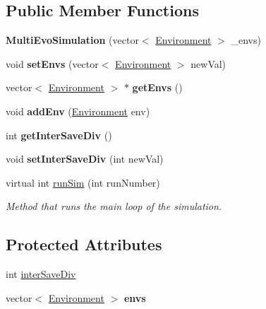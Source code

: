 \subsection*{Public Member Functions}
\begin{DoxyCompactItemize}
\item 
\mbox{\label{classMultiEvoSimulation_a39ba876ac0a8771dca1773b37de567dd}} 
{\bfseries Multi\+Evo\+Simulation} (vector$<$ \hyperlink{classEnvironment}{Environment} $>$ \+\_\+envs)
\item 
\mbox{\label{classMultiEvoSimulation_a965cbb6a21b59b1dcb69a8f7a5cdc63f}} 
void {\bfseries set\+Envs} (vector$<$ \hyperlink{classEnvironment}{Environment} $>$ new\+Val)
\item 
\mbox{\label{classMultiEvoSimulation_ad15f986cabbba30190e44c503bb02dbd}} 
vector$<$ \hyperlink{classEnvironment}{Environment} $>$ $\ast$ {\bfseries get\+Envs} ()
\item 
\mbox{\label{classMultiEvoSimulation_af1ed90eb8f214164e5944fa599bebc0f}} 
void {\bfseries add\+Env} (\hyperlink{classEnvironment}{Environment} env)
\item 
\mbox{\label{classMultiEvoSimulation_a38cb7774707b70d9d2b08f25132a2ca2}} 
int {\bfseries get\+Inter\+Save\+Div} ()
\item 
\mbox{\label{classMultiEvoSimulation_a325406773501841bbfb51b737ef4fdaf}} 
void {\bfseries set\+Inter\+Save\+Div} (int new\+Val)
\item 
virtual int \hyperlink{classMultiEvoSimulation_a89c9806ac998c06230cdd41cc6a532bf}{run\+Sim} (int run\+Number)
\begin{DoxyCompactList}\small\item\em Method that runs the main loop of the simulation. \end{DoxyCompactList}\end{DoxyCompactItemize}
\subsection*{Protected Attributes}
\begin{DoxyCompactItemize}
\item 
int \hyperlink{classMultiEvoSimulation_ac9389b3f03afb6195da67337cd1f1957}{inter\+Save\+Div}
\item 
\mbox{\label{classMultiEvoSimulation_a17a397017c8b5ea23810bd2f06fac253}} 
vector$<$ \hyperlink{classEnvironment}{Environment} $>$ {\bfseries envs}
\end{DoxyCompactItemize}



